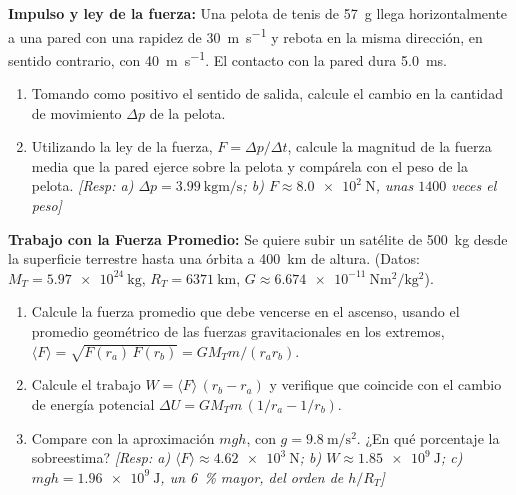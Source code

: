 
    \item \textbf{Impulso y ley de la fuerza:} Una pelota de tenis de
    \SI{57}{\gram} llega horizontalmente a una pared con una rapidez de
    \SI{30}{\meter\per\second} y rebota en la misma dirección, en sentido
    contrario, con \SI{40}{\meter\per\second}. El contacto con la pared dura
    \SI{5.0}{\milli\second}.
    \begin{enumerate}
        \item Tomando como positivo el sentido de salida, calcule el cambio en
        la cantidad de movimiento $\Delta p$ de la pelota.
        \item Utilizando la ley de la fuerza, $F = \Delta p/\Delta t$, calcule
        la magnitud de la fuerza media que la pared ejerce sobre la pelota y
        compárela con el peso de la pelota.
        \textit{[Resp: a) $\Delta p = \SI{3.99}{\kilo\gram\meter\per\second}$;
        b) $F \approx \SI{8.0e2}{\newton}$, unas $1400$ veces el peso]}
    \end{enumerate}

    \item \textbf{Trabajo con la Fuerza Promedio:} Se quiere subir un satélite
    de \SI{500}{\kilo\gram} desde la superficie terrestre hasta una órbita a
    \SI{400}{\kilo\meter} de altura. (Datos: $M_T = \SI{5.97e24}{\kilo\gram}$,
    $R_T = \SI{6371}{\kilo\meter}$,
    $G \approx \SI{6.674e-11}{\newton\meter\squared\per\kilo\gram\squared}$).
    \begin{enumerate}
        \item Calcule la fuerza promedio que debe vencerse en el ascenso,
        usando el promedio geométrico de las fuerzas gravitacionales en los
        extremos, $\langle F\rangle = \sqrt{F(r_a)\,F(r_b)} = GM_Tm/(r_a r_b)$.
        \item Calcule el trabajo $W = \langle F\rangle\,(r_b - r_a)$ y
        verifique que coincide con el cambio de energía potencial
        $\Delta U = GM_Tm\,(1/r_a - 1/r_b)$.
        \item Compare con la aproximación $mgh$, con
        $g = \SI{9.8}{\meter\per\second\squared}$. ¿En qué porcentaje la
        sobreestima? \textit{[Resp: a) $\langle F\rangle \approx
        \SI{4.62e3}{\newton}$; b) $W \approx \SI{1.85e9}{\joule}$;
        c) $mgh = \SI{1.96e9}{\joule}$, un \SI{6}{\percent} mayor, del orden
        de $h/R_T$]}
    \end{enumerate}

